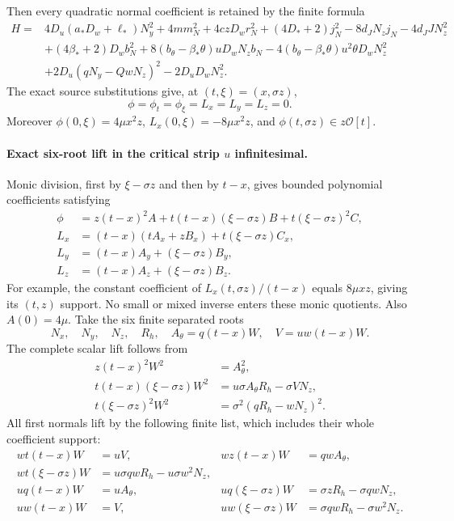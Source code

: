 Then every quadratic normal coefficient is retained by the finite formula
\begin{align*}
H={}&4D_u(a_*D_w+\ell_*)N_y^2+4mm_N^2+4czD_wr_N^2
 +(4D_*+2)j_N^2-8d_JN_zj_N-4d_JJN_z^2\\
&+(4\beta_*+2)D_wb_N^2+8(b_\theta-\beta_*\theta)uD_wN_zb_N
 -4(b_\theta-\beta_*\theta)u^2\theta D_wN_z^2\\
&+2D_u(qN_y-QwN_z)^2-2D_uD_wN_z^2.
\end{align*}
The exact source substitutions give, at $(t,\xi)=(x,\sigma z)$,
\[
\phi=\phi_t=\phi_\xi=L_x=L_y=L_z=0.
\]
Moreover $\phi(0,\xi)=4\mu x^2z$,
$L_x(0,\xi)=-8\mu x^2z$, and $\phi(t,\sigma z)\in z\mathcal O[t]$.

\paragraph{Exact six-root lift in the critical strip $u$ infinitesimal.}
Monic division, first by $\xi-\sigma z$ and then by $t-x$, gives bounded
polynomial coefficients satisfying
\begin{align*}
\phi&=z(t-x)^2 A+t(t-x)(\xi-\sigma z)B+t(\xi-\sigma z)^2C,\\
L_x&=(t-x)(tA_x+zB_x)+t(\xi-\sigma z)C_x,\\
L_y&=(t-x)A_y+(\xi-\sigma z)B_y,\\
L_z&=(t-x)A_z+(\xi-\sigma z)B_z.
\end{align*}
For example, the constant coefficient of
$L_x(t,\sigma z)/(t-x)$ equals $8\mu xz$, giving its $(t,z)$ support.
No small or mixed inverse enters these monic quotients. Also $A(0)=4\mu$.
Take the six finite separated roots
\[
 N_x,\quad N_y,\quad N_z,\quad R_h,\quad
 A_\theta=q(t-x)W,\quad V=uw(t-x)W.
\]
The complete scalar lift follows from
\begin{align*}
 z(t-x)^2W^2&=A_\theta^2,\\
 t(t-x)(\xi-\sigma z)W^2&=u\sigma A_\theta R_h-\sigma VN_z,\\
 t(\xi-\sigma z)^2W^2&=\sigma^2(qR_h-wN_z)^2.
\end{align*}
All first normals lift by the following finite list, which includes their
whole coefficient support:
\begin{align*}
wt(t-x)W&=uV,&wz(t-x)W&=qwA_\theta,\\
wt(\xi-\sigma z)W&=u\sigma qwR_h-u\sigma w^2N_z,\\
uq(t-x)W&=uA_\theta,&uq(\xi-\sigma z)W&=\sigma zR_h-\sigma qwN_z,\\
uw(t-x)W&=V,&uw(\xi-\sigma z)W&=\sigma qwR_h-\sigma w^2N_z.
\end{align*}
